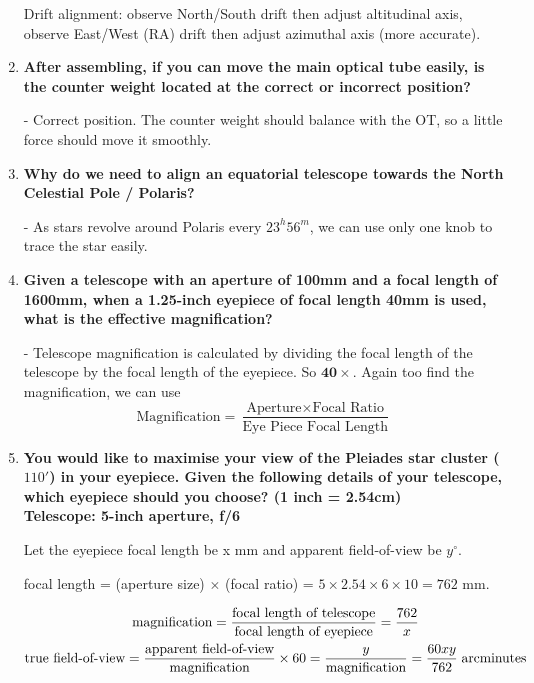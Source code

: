 \documentclass[a4paper,12pt]{extarticle}
\begin{document}
\begin{enumerate}
\begin{sol}
		Drift alignment: observe North/South drift then adjust altitudinal axis, observe East/West (RA) drift then adjust azimuthal axis (more accurate).
	\end{sol}
	
	\item  \textbf{After assembling, if you can move the main optical tube easily, is the counter weight located at the correct or incorrect position? }
	\begin{sol}
		- Correct position. The counter weight should balance with the OT, so a little force should move it smoothly. 
	\end{sol}
	\item \textbf{Why do we need to align an equatorial telescope towards the North Celestial Pole / Polaris?}
	\begin{sol}
	- As stars revolve around Polaris every $23^h56^m$, we can use only one knob to trace the star easily.		
	\end{sol}
	
	\item \textbf{Given a telescope with an aperture of 100mm and a focal length of 1600mm, when a 1.25-inch eyepiece
	of focal length 40mm is used, what is the effective magnification?}
\begin{sol}
- Telescope magnification is calculated by dividing the focal length of the telescope by the focal
length of the eyepiece. So $\mathbf{40\times}$. Again too find the magnification, we can use
\[\text{Magnification}=\frac{\text{Aperture}\times \text{Focal Ratio}}{\text{Eye Piece Focal Length}}\]
\end{sol}

\item \textbf{You would like to maximise your view of the Pleiades star cluster ($110'$) in your eyepiece. Given the following details of your telescope, which eyepiece should you choose? (1 inch = 2.54cm)}\\
\textbf{Telescope: 5-inch aperture, f/6}\\

\begin{sol}
Let the eyepiece focal length be x mm and apparent field-of-view be $y^\circ$.
	
focal length = (aperture size) $\times$ (focal ratio) = $5 \times 2.54 \times 6 \times 10 = 762$ mm.

\begin{gather*}
	\text{magnification}=\frac{\text{focal length of telescope}}{\text{focal length of eyepiece}}=\frac{762}{x}\\
	\text{true field-of-view}=\frac{\text{apparent field-of-view}}{\text{magnification}}\times 60= \frac{y}{\text{magnification}}=\frac{60xy}{762}\; \rm arcminutes
\end{gather*}


\end{sol}
\end{enumerate}
\end{document}
